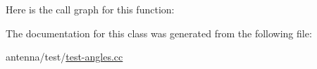 Here is the call graph for this function\+:




The documentation for this class was generated from the following file\+:\begin{DoxyCompactItemize}
\item 
antenna/test/\hyperlink{test-angles_8cc}{test-\/angles.\+cc}\end{DoxyCompactItemize}
